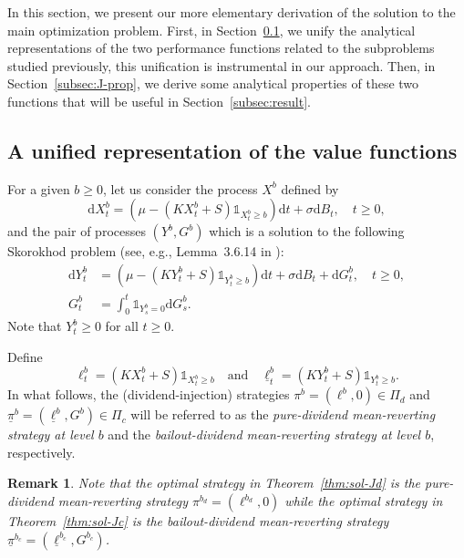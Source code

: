 \documentclass[11pt,reqno]{amsart}
\newtheorem{remark}[theorem]{Remark}
\newcommand{\ind}{\mathds{1}}
\newcommand{\diff}{\mathrm{d}}
\renewcommand{\geq}{\geqslant}
\begin{document}
In this section, we present our more elementary derivation of the solution to the main optimization problem. First, in Section~\ref{subsec:unified}, we unify the analytical representations of the two performance functions related to the subproblems studied previously, this unification is instrumental in our approach. Then, in Section~\ref{subsec:J-prop}, we derive some analytical properties of these two functions that will be useful in Section~\ref{subsec:result}.

\subsection{A unified representation of the value functions}\label{subsec:unified}

For a given $b\geq 0$, let us consider the process $X^b$ defined by
\begin{equation}
    \diff X^b_t = \left(\mu - (KX^b_t + S)\ind_{X^b_t\geq b}\right)\diff t + \sigma \diff B_t, \quad t\geq 0 ,
\end{equation}
and the pair of processes $(Y^b, G^b)$ which is a solution to the following Skorokhod problem (see, e.g., Lemma~3.6.14 in \cite{karatzas-shreve_1991}):
\begin{align}
    \diff Y^b_t &= \left(\mu - (KY^b_t + S)\ind_{Y^b_t\geq b}\right)\diff t + \sigma \diff B_t + \diff G^b_t, \quad t\geq 0 ,\\
    G^b_t &= \int_0^t \ind_{Y^b_s = 0} \diff G^b_s .
\end{align}
Note that $Y^b_t \geq 0$ for all $t\geq 0$.

Define
\begin{equation}
    \ell^b_t = (KX^b_t + S)\ind_{X^b_t\geq b} \quad \text{and} \quad \underline \ell^b_t = (KY^b_t + S)\ind_{Y^b_t\geq b}.    
\end{equation}
In what follows, the (dividend-injection) strategies $\pi^b = (\ell^b, 0) \in \Pi_d$ and $\underline{\pi}^b = (\underline \ell^b, G^b) \in \Pi_c$ will be referred to as the \textit{pure-dividend mean-reverting strategy at level $b$} and the \textit{bailout-dividend mean-reverting strategy at level $b$}, respectively.

\begin{remark}
    Note that the optimal strategy in Theorem~\ref{thm:sol-Jd} is the pure-dividend mean-reverting strategy $\pi^{b_d} = (\ell^{b_d}, 0)$ while the optimal strategy in Theorem~\ref{thm:sol-Jc} is the bailout-dividend mean-reverting strategy $\underline \pi^{b_c} = (\underline \ell^{b_c}, G^{b_c})$. 
\end{remark}
\end{document}
